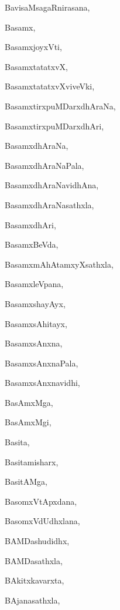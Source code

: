 \begin{multicols}{2}
{BavisaMsagaRnirasana}, \pageref{BavisaMsagaRnirasana}

{Basamx}, \pageref{Basamx}

{BasamxjoyxVti}, \pageref{BasamxjoyxVti}

{BasamxtatatxvX}, \pageref{BasamxtatatxvX}

{BasamxtatatxvXviveVki}, \pageref{BasamxtatatxvXviveVki}

{BasamxtirxpuMDarxdhAraNa}, \pageref{BasamxtirxpuMDarxdhAraNa}

{BasamxtirxpuMDarxdhAri}, \pageref{BasamxtirxpuMDarxdhAri}

{BasamxdhAraNa}, \pageref{BasamxdhAraNa}

{BasamxdhAraNaPala}, \pageref{BasamxdhAraNaPala}

{BasamxdhAraNavidhAna}, \pageref{BasamxdhAraNavidhAna}

{BasamxdhAraNasathxla}, \pageref{BasamxdhAraNasathxla}

{BasamxdhAri}, \pageref{BasamxdhAri}

{BasamxBeVda}, \pageref{BasamxBeVda}

{BasamxmAhAtamxyXsathxla}, \pageref{BasamxmAhAtamxyXsathxla}

{BasamxleVpana}, \pageref{BasamxleVpana}

{BasamxshayAyx}, \pageref{BasamxshayAyx}

{BasamxsAhitayx}, \pageref{BasamxsAhitayx}

{BasamxsAnxna}, \pageref{BasamxsAnxna}

{BasamxsAnxnaPala}, \pageref{BasamxsAnxnaPala}

{BasamxsAnxnavidhi}, \pageref{BasamxsAnxnavidhi}

{BasAmxMga}, \pageref{BasAmxMga}

{BasAmxMgi}, \pageref{BasAmxMgi}

{Basita}, \pageref{Basita}

{Basitamisharx}, \pageref{Basitamisharx}

{BasitAMga}, \pageref{BasitAMga}

{BasomxVtApxdana}, \pageref{BasomxVtApxdana}

{BasomxVdUdhxlana}, \pageref{BasomxVdUdhxlana}

{BAMDashudidhx}, \pageref{BAMDashudidhx}

{BAMDasathxla}, \pageref{BAMDasathxla}

{BAkitxkavarxta}, \pageref{BAkitxkavarxta}

{BAjanasathxla}, \pageref{BAjanasathxla}


\end{multicols}
